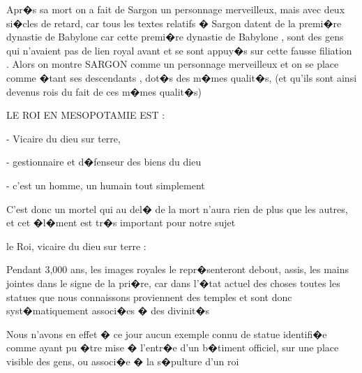 \documentclass{article}
\begin{document}
\bigskip

Apr�s sa mort on a fait de Sargon un personnage merveilleux, mais avec deux si�cles de retard, car tous les textes relatifs � Sargon datent de la premi�re dynastie de Babylone car cette premi�re dynastie de Babylone , sont des gens qui n'avaient pas de lien royal avant et se sont appuy�s sur cette fausse filiation . Alors on montre SARGON comme un personnage merveilleux et on se place comme �tant ses descendants , dot�s des m�mes qualit�s, (et qu'ils sont ainsi devenus rois du fait de ces m�mes qualit�s)


\bigskip


\bigskip


\bigskip


\bigskip


\bigskip


\bigskip


\bigskip


\bigskip


\bigskip


\bigskip


\bigskip


\bigskip


\bigskip


\bigskip

LE ROI EN MESOPOTAMIE EST :


\bigskip

{}- Vicaire du dieu sur terre,

{}- gestionnaire et d�fenseur des biens du dieu 

{}- c'est un homme, un humain tout simplement


\bigskip


\bigskip

C'est donc un mortel qui au del� de la mort n'aura rien de plus que les autres, et cet �l�ment est tr�s important pour notre sujet


\bigskip


\bigskip


\bigskip

le Roi, vicaire du dieu sur terre : \ 


\bigskip

Pendant 3,000 ans, les images royales le repr�senteront debout, assis, les mains jointes dans le signe de la pri�re, car dans l'�tat actuel des choses toutes les statues que nous connaissons proviennent des temples et sont donc syst�matiquement associ�es � des divinit�s

Nous n'avons en effet � ce jour aucun exemple connu de statue identifi�e comme ayant pu �tre mise � l'entr�e d'un b�timent officiel, sur une place visible des gens, ou associ�e � la s�pulture d'un roi
\end{document}
